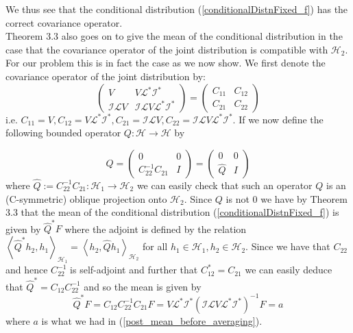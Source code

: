 \documentclass{article}
\theoremstyle{definition}
\theoremstyle{remark}
\begin{document}
We thus see that the conditional distribution (\ref{conditionalDistnFixed_f}) has the correct covariance operator. \\

Theorem 3.3 also goes on to give the mean of the conditional distribution in the case that the covariance operator of the joint distribution is compatible with $\mathcal{H}_{2}$. For our problem this is in fact the case as we now show. We first denote the covariance operator of the joint distribution by:
\begin{equation}
    \begin{pmatrix}
        V & V\mathcal{L}^{*}\mathcal{I}^{*} \\
        \mathcal{I}\mathcal{L}V & \mathcal{I}\mathcal{L}V\mathcal{L}^{*}\mathcal{I}^{*}
    \end{pmatrix}=
    \begin{pmatrix}
        C_{11} & C_{12} \\
        C_{21} & C_{22}
    \end{pmatrix}
\end{equation}
i.e. $C_{11}=V, C_{12}=V\mathcal{L}^{*}\mathcal{I}^{*}, C_{21}=\mathcal{I}\mathcal{L}V, C_{22}=\mathcal{I}\mathcal{L}V\mathcal{L}^{*}\mathcal{I}^{*}$. If we now define the following bounded operator $Q:\mathcal{H}\rightarrow\mathcal{H}$ by

\begin{equation}
    Q = \begin{pmatrix}
            0 & 0 \\
            C_{22}^{-1}C_{21} & I
        \end{pmatrix} = \begin{pmatrix}
                            0 & 0 \\
                            \hat{Q} & I
                        \end{pmatrix}
\end{equation}
where $\hat{Q}:=C_{22}^{-1}C_{21}:\mathcal{H}_{1}\rightarrow\mathcal{H}_{2}$ we can easily check that such an operator $Q$ is an (C-symmetric) oblique projection onto $\mathcal{H}_{2}$. Since $Q$ is not $0$ we have by Theorem 3.3 that the mean of the conditional distribution (\ref{conditionalDistnFixed_f}) is given by $\hat{Q}^{*}F$ where the adjoint is defined by the relation $\left\langle\hat{Q}^{*} h_{2}, h_{1}\right\rangle_{\mathcal{H}_{1}}=\left\langle h_{2}, \hat{Q} h_{1}\right\rangle_{\mathcal{H}_{2}}$ for all $h_1\in\mathcal{H}_1,h_{2}\in\mathcal{H}_{2}$. Since we have that $C_{22}$ and hence $C_{22}^{-1}$ is self-adjoint and further that $C_{12}^{*}=C_{21}$ we can easily deduce that $\hat{Q}^{*}=C_{12}C_{22}^{-1}$ and so the mean is given by
\begin{equation}
    \hat{Q}^{*}F=C_{12}C_{22}^{-1}C_{21}F=V\mathcal{L}^{*}\mathcal{I}^{*}(\mathcal{I}\mathcal{L}V\mathcal{L}^{*}\mathcal{I}^{*})^{-1}F=a
\end{equation}
where $a$ is what we had in (\ref{post_mean_before_averaging}). \\
\end{document}
